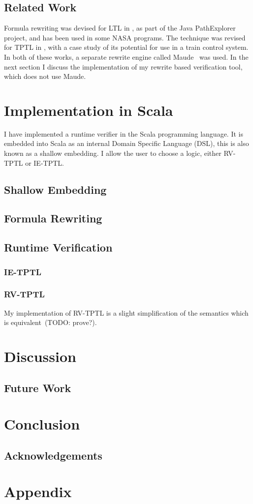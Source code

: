 \documentclass[a4paper]{article}
\begin{document}
\subsection{Related Work}
Formula rewriting was devised for LTL in \textcite{rosu2005rewriting}, as part of the Java PathExplorer project, and has been used in some NASA programs. The technique was revised for TPTL in \textcite{chai2013rewriting}, with a case study of its potential for use in a train control system. In both of these works, a separate rewrite engine called Maude~\autocite{clavel2002maude} was used. In the next section I discuss the implementation of my rewrite based verification tool, which does not use Maude.

\section{Implementation in Scala}\label{implementaion}
I have implemented a runtime verifier in the Scala programming language.
It is embedded into Scala as an internal Domain Specific Language (DSL), this is also known as a shallow embedding.
I allow the user to choose a logic, either RV-TPTL or IE-TPTL.
\subsection{Shallow Embedding}
\subsection{Formula Rewriting}
\subsection{Runtime Verification}

\subsubsection{IE-TPTL}
\subsubsection{RV-TPTL}
My implementation of RV-TPTL is a slight simplification of the semantics which is equivalent~({\color{red}TODO: prove?}). %




\section{Discussion}
\subsection{Future Work}
\section{Conclusion}
\subsection{Acknowledgements}

\nocite{*}
\printbibliography{}
\newpage
\section{Appendix}\label{appendix}
\end{document}
